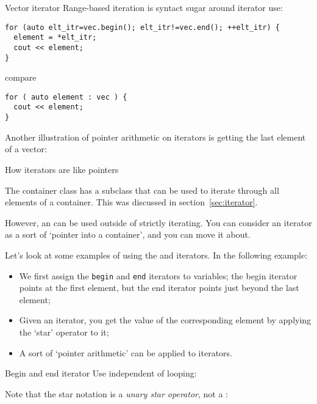 \begin{slide}{Vector iterator}
  \label{sl:iterate-vector}
  Range-based iteration is syntact sugar around
  iterator use:
\begin{lstlisting}
for (auto elt_itr=vec.begin(); elt_itr!=vec.end(); ++elt_itr) {
  element = *elt_itr;
  cout << element;
}
\end{lstlisting}
compare
\begin{lstlisting}
for ( auto element : vec ) {
  cout << element;
}
\end{lstlisting}
\end{slide}

Another illustration of pointer arithmetic on iterators is getting the
last element of a vector:
%

 {How iterators are like pointers}
\label{sec:iterator-class}

The container class has a subclass  that can be
used to iterate through all elements of a container. This was
discussed in section~\ref{sec:iterator}.

However, an  can be used outside of strictly iterating.
You can consider an iterator as a sort of `pointer into a container',
and you can move it about.

Let's look at some examples of using
the  and  iterators.
In the following example:
\begin{itemize}
\item We first assign the \lstinline{begin} and \lstinline{end} iterators to variables;
  the begin iterator points at the first element,
  but the end iterator points just beyond the last element;
\item Given an iterator, you get the value of the corresponding element by
  applying the `star' operator to it;
\item A sort of `pointer arithmetic' can be applied to iterators.
\end{itemize}

\begin{block}{Begin and end iterator}
  \label{sl:vec-iterator}
  Use independent of looping:
\end{block}

Note that the star notation is a
\emph{unary star operator},
not a
:
%

